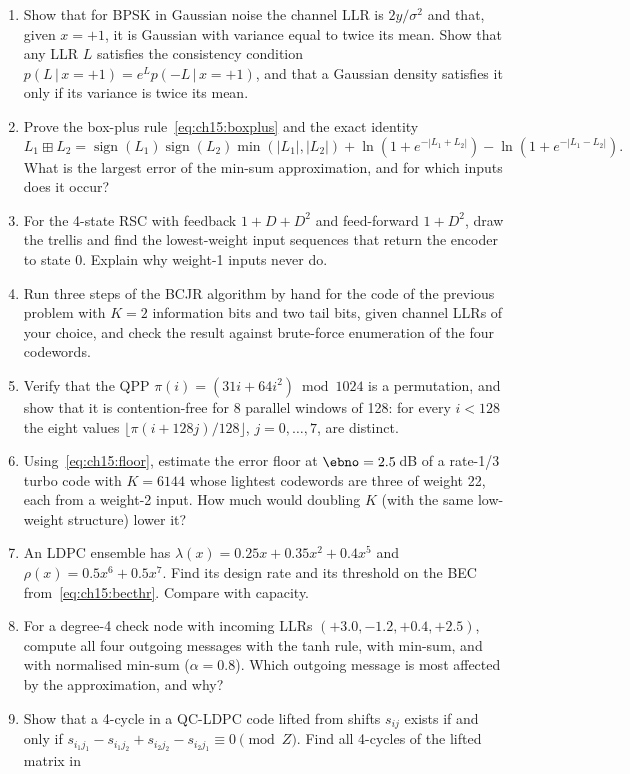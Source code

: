 \problems
\begin{enumerate}[label=\thechapter.\arabic*]
\item Show that for BPSK in Gaussian noise the channel LLR is $2y/\sigma^2$ and that, given $x=+1$, it
is Gaussian with variance equal to twice its mean. Show that any LLR $L$ satisfies the consistency
condition $p(L\,|\,x=+1)=e^{L}p(-L\,|\,x=+1)$, and that a Gaussian density satisfies it only if its
variance is twice its mean.
\item Prove the box-plus rule~\eqref{eq:ch15:boxplus} and the exact identity
\[L_1\boxplus L_2=\operatorname{sign}(L_1)\operatorname{sign}(L_2)\min(|L_1|,|L_2|)+\ln(1+e^{-|L_1+L_2|})-\ln(1+e^{-|L_1-L_2|}).\]
What is the largest error of the min-sum approximation, and for which inputs does it occur?
\item For the 4-state RSC with feedback $1+D+D^2$ and feed-forward $1+D^2$, draw the trellis and
find the lowest-weight input sequences that return the encoder to state 0. Explain why weight-1
inputs never do.
\item Run three steps of the BCJR algorithm by hand for the code of the previous problem with
$K=2$ information bits and two tail bits, given channel LLRs of your choice, and check the result
against brute-force enumeration of the four codewords.
\item Verify that the QPP $\pi(i)=(31i+64i^2)\bmod1024$ is a permutation, and show that it is
contention-free for 8 parallel windows of 128: for every $i<128$ the eight values
$\lfloor\pi(i+128j)/128\rfloor$, $j=0,\dots,7$, are distinct.
\item Using~\eqref{eq:ch15:floor}, estimate the error floor at $\ebno=2.5$\,dB of a rate-1/3 turbo
code with $K=6144$ whose lightest codewords are three of weight 22, each from a weight-2 input. How
much would doubling $K$ (with the same low-weight structure) lower it?
\item An LDPC ensemble has $\lambda(x)=0.25x+0.35x^2+0.4x^5$ and $\rho(x)=0.5x^6+0.5x^7$. Find its
design rate and its threshold on the BEC from~\eqref{eq:ch15:becthr}. Compare with capacity.
\item For a degree-4 check node with incoming LLRs $(+3.0,-1.2,+0.4,+2.5)$, compute all four outgoing
messages with the tanh rule, with min-sum, and with normalised min-sum ($\alpha=0.8$). Which
outgoing message is most affected by the approximation, and why?
\item Show that a 4-cycle in a QC-LDPC code lifted from shifts $s_{ij}$ exists if and only if
$s_{i_1j_1}-s_{i_1j_2}+s_{i_2j_2}-s_{i_2j_1}\equiv0\pmod Z$. Find all 4-cycles of the lifted matrix in

\end{enumerate}
